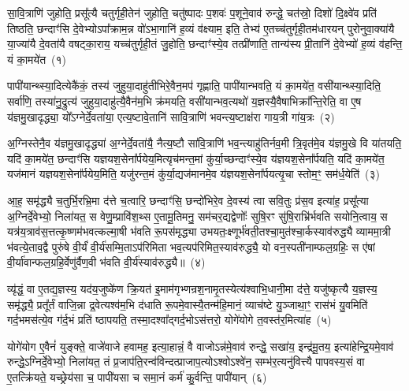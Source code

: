 \setcounter{anuvakam}{0}
सा॒वि॒त्राणि॑ जुहोति॒ प्रसू᳚त्यै चतुर्गृही॒तेन॑ जुहोति॒ चतु॑ष्पादः प॒शवः॑ प॒शूने॒वाव॑ रुन्द्धे॒ चत॑स्रो॒ दिशो॑ दि॒क्ष्वे॑व प्रति॑ तिष्ठति॒ छन्दाꣳ॑सि दे॒वेभ्यो\-ऽपा᳚क्राम॒न्न वो॑\-ऽभा॒गानि॑ ह॒व्यं व॑क्ष्याम॒ इति॒ तेभ्य॑ ए॒तच्च॑तुर्गृही॒तम॑धारयन् पुरोनुवा॒क्या॑यै या॒ज्या॑यै दे॒वता॑यै वषट्का॒राय॒ यच्च॑तुर्गृही॒तं जु॒होति॒ छन्दाꣳ॑स्ये॒व तत्प्री॑णाति॒ तान्य॑स्य प्री॒तानि॑ दे॒वेभ्यो॑ ह॒व्यं व॑हन्ति॒ यं का॒मये॑त~(१)

पापी॑यान्थ्स्या॒दित्येकै॑कं॒ तस्य॑ जुहुया॒दाहु॑तीभिरे॒वैन॒मप॑ गृह्णाति॒ पापी॑यान्भवति॒ यं का॒मये॑त॒ वसी॑यान्थ्स्या॒दिति॒ सर्वा॑णि॒ तस्या॑नु॒द्रुत्य॑ जुहुया॒दाहु॑त्यै॒वैन॑म॒भि क्र॑मयति॒ वसी॑यान्भव॒त्यथो॑ य॒ज्ञस्यै॒वैषाभिक्रा᳚न्ति॒रेति॒ वा ए॒ष य॑ज्ञमु॒खादृद्ध्या॒ यो᳚\-ऽग्नेर्दे॒वता॑या॒ एत्य॒ष्टावे॒तानि॑ सावि॒त्राणि॑ भवन्त्य॒ष्टाक्ष॑रा गाय॒त्री गा॑य॒त्रः~(२)

अ॒ग्निस्तेनै॒व य॑ज्ञमु॒खादृद्ध्या॑ अ॒ग्नेर्दे॒वता॑यै॒ नैत्य॒ष्टौ सा॑वि॒त्राणि॑ भव॒न्त्याहु॑तिर्नव॒मी त्रि॒वृत॑मे॒व य॑ज्ञमु॒खे वि या॑तयति॒ यदि॑ का॒मये॑त॒ छन्दाꣳ॑सि यज्ञयश॒सेना᳚र्पयेय॒मित्यृच॑मन्त॒मां कु॑र्या॒च्छन्दाꣳ॑स्ये॒व य॑ज्ञयश॒सेना᳚र्पयति॒ यदि॑ का॒मये॑त॒ यज॑मानं यज्ञयश॒सेना᳚र्पयेय॒मिति॒ यजु॑रन्त॒मं कु॑र्या॒द्यज॑मानमे॒व य॑ज्ञयश॒सेना᳚र्पयत्यृ॒चा स्तोम॒ꣳ॒ सम॑र्ध॒येति॑~(३)

आ॒ह॒ समृ॑द्ध्यै च॒तुर्भि॒रभ्रि॒मा द॑त्ते च॒त्वारि॒ छन्दाꣳ॑सि॒ छन्दो॑भिरे॒व दे॒वस्य॑ त्वा सवि॒तुः प्र॑स॒व इत्या॑ह॒ प्रसू᳚त्या अ॒ग्निर्दे॒वेभ्यो॒ निला॑यत॒ स वेणु॒म्प्रावि॑श॒थ्स ए॒तामू॒तिमनु॒ सम॑चर॒द्यद्वेणोः᳚ सुषि॒रꣳ सु॑षि॒राभ्रि॑र्भवति सयोनि॒त्वाय॒ स यत्र॑य॒त्राव॑स॒त्तत्कृ॒ष्णम॑भवत्कल्मा॒षी भ॑वति रू॒पस॑मृद्ध्या उभयतः॒क्ष्णूर्भ॑वती॒तश्चा॒मुत॑श्चा॒र्कस्याव॑रुद्ध्यै व्याममा॒त्री भ॑वत्ये॒ताव॒द्वै पुरु॑षे वी॒र्यं॑ वी॒र्य॑सम्मि॒ता\-ऽप॑रिमिता भव॒त्यप॑रिमित॒स्याव॑रुद्ध्यै॒ यो वन॒स्पती॑नाम्फल॒ग्रहिः॒ स ए॑षां वी॒र्या॑वान्फल॒ग्रहि॒र्वेणु॑र्वैण॒वी भ॑वति वी॒र्य॑स्याव॑रुद्ध्यै॥~(४)

{\anuvakamend[{का॒मये॑त गाय॒त्रो᳚\-ऽर्ध॒येति॑ च स॒प्तविꣳ॑शतिश्च}]}%

व्यृ॑द्धं॒ वा ए॒तद्य॒ज्ञस्य॒ यद॑य॒जुष्के॑ण क्रि॒यत॑ इ॒माम॑गृभ्णन्रश॒नामृ॒तस्येत्य॑श्वाभि॒धानी॒मा द॑त्ते॒ यजु॑ष्कृत्यै य॒ज्ञस्य॒ समृ॑द्ध्यै॒ प्रतू᳚र्तं वाजि॒न्ना द्र॒वेत्यश्व॑म॒भि द॑धाति रू॒पमे॒वास्यै॒तन्म॑हि॒मानं॒ व्याच॑ष्टे यु॒ञ्जाथा॒ꣳ॒ रास॑भं यु॒वमिति॑ गर्द॒भमस॑त्ये॒व ग॑र्द॒भं प्रति॑ ष्ठापयति॒ तस्मा॒दश्वा᳚द्गर्द॒भो\-ऽस॑त्तरो॒ योगे॑योगे त॒वस्त॑र॒मित्या॑ह~(५)

योगे॑योग ए॒वैनं॑ युङ्क्ते॒ वाजे॑वाजे हवामह॒ इत्या॒हान्नं॒ वै वाजो\-ऽन्न॑मे॒वाव॑ रुन्द्धे॒ सखा॑य॒ इन्द्र॑मू॒तय॒ इत्या॑हेन्द्रि॒यमे॒वाव॑ रुन्द्धे॒\-ऽग्निर्दे॒वेभ्यो॒ निला॑यत॒ तं प्र॒जाप॑ति॒रन्व॑विन्दत्प्राजाप॒त्यो\-ऽश्वो\-ऽश्वे॑न॒ सम्भ॑र॒त्यनु॑वित्त्यै पापवस्य॒सं वा ए॒तत्क्रि॑यते॒ यच्छ्रेय॑सा च॒ पापी॑यसा च समा॒नं कर्म॑ कु॒र्वन्ति॒ पापी॑यान्~(६)

